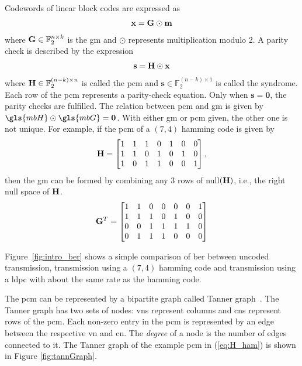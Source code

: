 Codewords of linear block codes are expressed as \begin{align}\mathbf{x}=\mathbf{G}\odot\mathbf{m}\end{align} where $\mathbf{G}\in\mathbb{F}_2^{n\times k}$ is the \gls{gm} and $\odot$ represents multiplication modulo 2. A parity check is described by the expression \begin{align}\mathbf{s}=\mathbf{H}\odot\mathbf{x}\end{align} where $\mathbf{H}\in\mathbb{F}_2^{(n-k)\times n}$ is called the \gls{pcm} and $\mathbf{s}\in\mathbb{F}_2^{(n-k)\times 1}$ is called the syndrome. Each row of the \gls{pcm} represents a parity-check equation. Only when $\mathbf{s}=\mathbf{0}$, the parity checks are fulfilled. The relation between \gls{pcm} and \gls{gm} is given by $\gls{mbH}\odot\gls{mbG}=\mathbf{0}$. With either \gls{gm} or \gls{pcm} given, the other one is not unique. For example, if the \gls{pcm} of a $(7,4)$ hamming code is given by
\begin{align} \label{eq:H_ham}
\mathbf{H} =
\begin{bmatrix}
1 &1 &1 &0 &1 &0 &0 \\
1 &1 &0 &1 &0 &1 &0 \\
1 &0 &1 &1 &0 &0 &1
\end{bmatrix},
\end{align}
then the \gls{gm} can be formed by combining any 3 rows of null$(\mathbf{H})$, i.e., the right null space of $\mathbf{H}$.
\begin{align} \label{eq:G_ham}
\mathbf{G}^T =
\begin{bmatrix}
1 &1 &0 &0 &0 &0 &1 \\
1 &1 &1 &0 &1 &0 &0 \\
0 &0 &1 &1 &1 &1 &0 \\
0 &1 &1 &1 &0 &0 &0
\end{bmatrix}
\end{align}

Figure~\ref{fig:intro_ber} shows a simple comparison of \gls{ber} between uncoded transmission, transmission using a $(7,4)$ hamming code and transmission using a \gls{ldpc} with about the same rate as the hamming code.

The \gls{pcm} can be represented by a bipartite graph called Tanner graph~\cite{Tanner1981}. The Tanner graph has two sets of nodes: \glspl{vn} represent columns and \glspl{cn} represent rows of the \gls{pcm}. Each non-zero entry in the \gls{pcm} is represented by an edge between the respective \gls{vn} and \gls{cn}. The \emph{degree} of a node is the number of edges connected to it. The Tanner graph of the example \gls{pcm} in (\ref{eq:H_ham}) is shown in Figure \ref{fig:tannGraph}.

